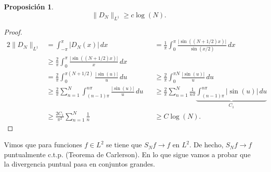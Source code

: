 \documentclass{article}
\newtheorem{Proposicion}{Proposición}
\theoremstyle{plain}
\theoremstyle{definition}
\newcommand{\abs}[1]{\lvert #1 \rvert}
\newcommand{\normL}[2]{\lVert #2 \rVert_{L^#1}}
\begin{document}
\begin{Proposicion}
  \begin{displaymath}
    \normL{1}{D_N} \ge c\log(N).
  \end{displaymath}
\end{Proposicion}
\begin{proof}
\begin{alignat*}{2}
  \normL{1}{D_N}
  &=
  \int_{-\pi}^{\pi} 
    \abs{D_N(x)} 
  \,dx
  &&=
  \frac{1}{\pi}
  \int_{0}^{\pi} 
    \frac{\abs{\sin((N+1/2) x)}}{ \sin(x/2) }
  \,dx
  \\&\ge
  \frac{2}{\pi}
  \int_{0}^{\pi} 
    \frac{\abs{\sin((N+1/2) x)}}{ x }
  \,dx
  \\&=
  \frac{2}{\pi}
  \int_{0}^{\pi (N+1/2)} 
    \frac{\abs{\sin(u)}}{ u }
  \, du
  &&\ge
  \frac{2}{\pi}
  \int_{0}^{\pi N} 
    \frac{\abs{\sin(u)}}{ u }
  \, du
  \\&\ge
  \frac{2}{\pi}
  \sum_{n=1}^{N}
    \int_{(n-1)\pi}^{n\pi} 
      \frac{\abs{\sin(u)}}{ u }
    \, du
  &&\ge
  \frac{2}{\pi}
  \sum_{n=1}^{N}
    \frac{1}{n\pi}
    \underbrace{
    \int_{(n-1)\pi}^{n\pi} 
      \abs{\sin(u)}
    \, du}_{C_1}
  \\&\ge
  \frac{2 C_1}{\pi^2}
  \sum_{n=1}^{N}
    \frac{1}{n}
  &&\ge C \log(N).
\end{alignat*}
\end{proof}

Vimos que para funciones \(f\in L^2\) se tiene que \(S_N f \to f\) en \(L^2\). De hecho,
\(S_N f \to f\) puntualmente c.t.p. (Teorema de Carlerson). 
En lo que sigue vamos a probar que la divergencia puntual pasa en conjuntos grandes.
\end{document}
